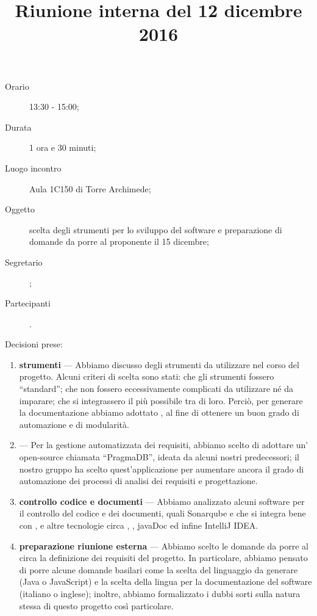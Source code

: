 


\author{\PB}
\supervisor{\MM}
\dest{\ALL}
\title{Riunione interna del 12 dicembre 2016}



\maketitle

\begin{description}
	\item[Orario] 13:30 - 15:00;
	\item[Durata] 1 ora e 30 minuti;
	\item[Luogo incontro] Aula 1C150 di Torre Archimede;
	\item[Oggetto] scelta degli strumenti per lo sviluppo del software e preparazione di domande da porre al proponente il 15 dicembre;
	\item[Segretario] \PB;
	\item[Partecipanti] \ALL.
\end{description}

Decisioni prese:
\begin{enumerate}
	\item \textbf{strumenti} --- Abbiamo discusso degli strumenti da utilizzare nel corso del progetto. Alcuni criteri di scelta sono stati: che gli strumenti fossero “standard”; che non fossero eccessivamente complicati da utilizzare né da imparare; che si integrassero il più possibile tra di loro. Perciò, per generare la documentazione abbiamo adottato , al fine di ottenere un buon grado di automazione e di modularità.
	\item \textbf{} --- Per la gestione automatizzata dei requisiti, abbiamo scelto di adottare un' open-source chiamata “PragmaDB”, ideata da alcuni nostri predecessori; il nostro gruppo ha scelto quest'applicazione per aumentare ancora il grado di automazione dei processi di analisi dei requisiti e progettazione.
	\item \textbf{controllo codice e documenti} --- Abbiamo analizzato alcuni software per il controllo del codice e dei documenti, quali Sonarqube e  che si integra bene con , e altre tecnologie circa , , javaDoc ed infine IntelliJ IDEA.
	\item \textbf{preparazione riunione esterna} --- Abbiamo scelto le domande da porre al \GP circa la definizione dei requisiti del progetto. In particolare, abbiamo pensato di porre alcune domande basilari come la scelta del linguaggio da generare (Java o JavaScript) e la scelta della lingua per la documentazione del software (italiano o inglese); inoltre, abbiamo formalizzato i dubbi sorti sulla natura stessa di questo progetto così particolare.
\end{enumerate}



